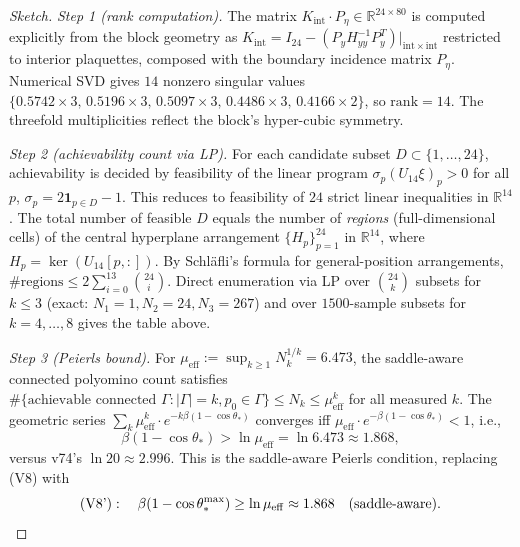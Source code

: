 \documentclass[11pt]{article}
\theoremstyle{definition}
\begin{document}
\begin{proof}[Sketch]
\emph{Step 1 \textup{(}rank computation\textup{)}.}  The matrix
$K_{\mathrm{int}}\cdot P_\eta\in\mathbb{R}^{24\times 80}$ is computed
explicitly from the block geometry as
$K_{\mathrm{int}}=I_{24}-(P_y H_{yy}^{-1}P_y^T)|_{\mathrm{int}\times\mathrm{int}}$
restricted to interior plaquettes, composed with the boundary
incidence matrix $P_\eta$.  Numerical SVD gives $14$ nonzero
singular values $\{0.5742\times 3,\,0.5196\times 3,\,0.5097\times 3,
\,0.4486\times 3,\,0.4166\times 2\}$, so
$\mathrm{rank}=14$.  The threefold multiplicities reflect the
block's hyper-cubic symmetry.

\emph{Step 2 \textup{(}achievability count via LP\textup{)}.}  For each
candidate subset $D\subset\{1,\dots,24\}$, achievability is decided
by feasibility of the linear program
$\sigma_p(U_{14}\xi)_p>0$ for all $p$, $\sigma_p=2\mathbf{1}_{p\in D}-1$.
This reduces to feasibility of $24$ strict linear inequalities in
$\mathbb{R}^{14}$.  The total number of feasible $D$ equals the
number of \emph{regions} \textup{(}full-dimensional cells\textup{)}
of the central hyperplane arrangement $\{H_p\}_{p=1}^{24}$ in
$\mathbb{R}^{14}$, where $H_p=\ker(U_{14}[p,:])$.  By Schl\"afli's
formula for general-position arrangements,
$\#\text{regions}\le 2\sum_{i=0}^{13}\binom{24}{i}$.  Direct
enumeration via LP over $\binom{24}{k}$ subsets for $k\le 3$ \textup{(}exact:
$N_1=1, N_2=24, N_3=267$\textup{)} and over $1500$-sample subsets for
$k=4,\dots,8$ gives the table above.

\emph{Step 3 \textup{(}Peierls bound\textup{)}.}
For $\mu_{\mathrm{eff}}:=\sup_{k\ge 1}N_k^{1/k}=6.473$,
the saddle-aware connected polyomino count satisfies
$\#\{\text{achievable connected }\Gamma:|\Gamma|=k,p_0\in\Gamma\}
\le N_k\le\mu_{\mathrm{eff}}^k$ for all measured $k$.  The
geometric series $\sum_k\mu_{\mathrm{eff}}^k\cdot
e^{-k\beta(1-\cos\theta_*)}$ converges iff
$\mu_{\mathrm{eff}}\cdot e^{-\beta(1-\cos\theta_*)}<1$,
i.e.,
\[
\beta(1-\cos\theta_*)>\ln\mu_{\mathrm{eff}}=\ln 6.473\approx 1.868,
\]
versus v74's $\ln 20\approx 2.996$.  This is the saddle-aware
Peierls condition, replacing (V8) with
\[
\textup{(V8')}:\quad\beta(1-\cos\theta_*^{\max})\ge\ln\mu_{\mathrm{eff}}
\approx 1.868\quad(\text{saddle-aware}).
\]


\end{proof}
\end{document}
